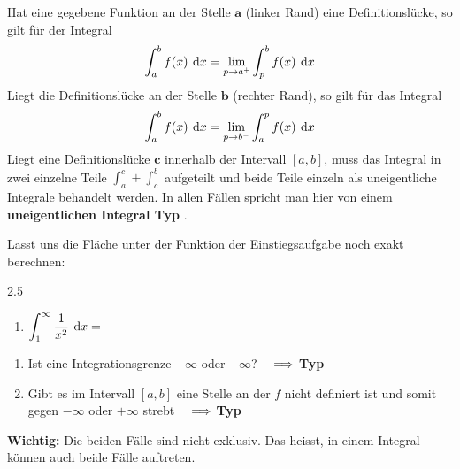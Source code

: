 	\begin{definition}
		Hat eine gegebene Funktion an der Stelle $\boldsymbol{a}$ (linker Rand) eine Definitionslücke, so gilt für der Integral \[\int_{a}^{b}f(x)\:\operatorname{d}\!{x}=\lim_{p\rightarrow a^+}\int_{p}^{b}f(x)\:\operatorname{d}\!{x}\]
		Liegt die Definitionslücke an der Stelle $\boldsymbol{b}$ (rechter Rand), so gilt für das Integral \[\int_{a}^{b}f(x)\:\operatorname{d}\!{x}=\lim_{p\rightarrow b^-}\int_{a}^{p}f(x)\:\operatorname{d}\!{x}\]
		Liegt eine Definitionslücke $\boldsymbol{c}$ innerhalb der Intervall $\left[a,b\right]$, muss das Integral in zwei einzelne Teile $\int_{a}^{c}+\int_{c}^{b}$ aufgeteilt und beide Teile einzeln als uneigentliche Integrale behandelt werden. In allen Fällen spricht man hier von einem \textbf{uneigentlichen Integral Typ }.
	\end{definition}
	\begin{beispiel}
		Lasst uns die Fläche unter der Funktion der Einstiegsaufgabe noch exakt berechnen:
		\begin{gridspace}{2.5}
			\begin{enumerate}[label=\ ]\vspace{-2.5mm}
				\item $\displaystyle\int_{1}^{\infty}\frac{1}{x^2}\:\operatorname{d}\!{x}=$
			\end{enumerate}
		\end{gridspace}
	\end{beispiel}
	\begin{satz}
		\begin{enumerate}
			\item Ist eine Integrationsgrenze $-\infty$ oder $+\infty$? $\displaystyle\quad\Longrightarrow$ \textbf{Typ }
			\item Gibt es im Intervall $\left[a,b\right]$ eine Stelle an der $f$ nicht definiert ist und somit gegen $-\infty$ oder $+\infty$ strebt $\displaystyle\quad\Longrightarrow$ \textbf{Typ }
		\end{enumerate}
		\textbf{Wichtig:} Die beiden Fälle sind nicht exklusiv. Das heisst, in einem Integral können auch beide Fälle auftreten.
	\end{satz}
